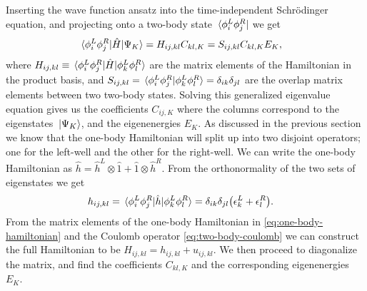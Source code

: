 \documentclass[twocolumn,superscriptaddress,unsortedaddress,
 amsmath,amssymb,
 aps,
]{revtex4-2}
\begin{document}
        Inserting the wave function ansatz into the time-independent Schrödinger
        equation, and projecting onto a two-body state
        $\bra*{\phi^L_i \phi^R_j}$ we get
        \begin{align*}
            \mel*{\phi^L_i \phi^R_j}{\hat{H}}{\Psi_K}
            &= %
            H_{ij, kl} C_{kl, K}
            = S_{ij, kl} C_{kl, K} E_{K},
        \end{align*}
        where $H_{ij, kl} \equiv \mel*{\phi^L_i \phi^R_j}{\hat{H}}{
        \phi^L_k \phi^R_l}$ are the matrix elements of the Hamiltonian in
        the product basis, and $S_{ij, kl} = \braket*{
        \phi^L_i \phi^R_j}{\phi^L_k \phi^R_l} = \delta_{ik} \delta_{jl}$ are
        the overlap matrix elements between two two-body states.
        Solving this generalized eigenvalue equation gives us the
        coefficients $C_{ij, K}$ where the columns correspond to the
        eigenstates $\ket*{\Psi_K}$, and the eigenenergies $E_K$.
        As discussed in the previous section we know that the one-body Hamiltonian
        will split up into two disjoint operators; one for the left-well and the
        other for the right-well.
        We can write the one-body Hamiltonian as $\hat{h} = \hat{h}^L \otimes \hat{1}
        + \hat{1} \otimes \hat{h}^{R}$.
        From the orthonormality of the two sets of eigenstates we get
        \begin{align}
            h_{ij, kl}
            &= \mel*{\phi^L_i \phi^R_j}{\hat{h}}{\phi^L_k \phi^R_l}
            = \delta_{ik} \delta_{jl} \qty(
                \epsilon^L_k
                + \epsilon^{R}_l
            ).
            \label{eq:one-body-hamiltonian}
        \end{align}
        From the matrix elements of the one-body Hamiltonian in
        \eqref{eq:one-body-hamiltonian} and the Coulomb operator
        \eqref{eq:two-body-coulomb} we can construct the full Hamiltonian
        to be $H_{ij, kl} = h_{ij, kl} + u_{ij, kl}$.
        We then proceed to diagonalize the matrix, and find the coefficients
        $C_{kl, K}$ and the corresponding eigenenergies $E_K$.
\end{document}
